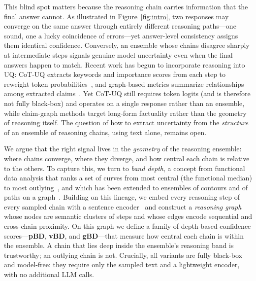 \documentclass[letterpaper]{article} %
\begin{document}
This blind spot matters because the reasoning chain carries information that the
final answer cannot. As illustrated in Figure~\ref{fig:intro}, two responses may
converge on the same answer through entirely different reasoning paths---one
sound, one a lucky coincidence of errors---yet answer-level consistency assigns
them identical confidence.
Conversely, an ensemble whose chains disagree sharply at intermediate steps
signals genuine model uncertainty even when the final answers happen to match.
Recent work has begun to incorporate reasoning into UQ: CoT-UQ extracts
keywords and importance scores from each step to reweight token
probabilities~\citep{zhang2025cotuq}, and graph-based metrics summarize
relationships among extracted claims~\citep{jiang2024graphuncertainty}. Yet
CoT-UQ still requires token logits (and is therefore not fully black-box) and
operates on a single response rather than an ensemble, while claim-graph methods
target long-form factuality rather than the geometry of reasoning itself. The
question of how to extract uncertainty from the \emph{structure} of an ensemble
of reasoning chains, using text alone, remains open.

We argue that the right signal lives in the \emph{geometry} of the reasoning
ensemble: where chains converge, where they diverge, and how central each chain
is relative to the others. To capture this, we turn to \emph{band depth}, a
concept from functional data analysis that ranks a set of curves from most
central (the functional median) to most outlying~\citep{lopezpintado2009banddepth},
and which has been extended to ensembles of contours and of paths on a
graph~\citep{santer2023contourbanddepth, raj2017pathboxplots}. Building on this
lineage, we embed every reasoning step of every sampled chain with a sentence
encoder~\citep{reimers2019sentencebert} and construct a \emph{reasoning graph}
whose nodes are semantic clusters of steps and whose edges encode sequential and
cross-chain proximity. On this graph we define a family of depth-based
confidence scores---\textbf{pBD}, \textbf{vBD}, and \textbf{gBD}---that measure
how central each chain is within the ensemble. A chain that lies deep inside the
ensemble's reasoning band is trustworthy; an outlying chain is not. Crucially,
all variants are fully black-box and model-free: they require only the sampled
text and a lightweight encoder, with no additional LLM calls.
\end{document}
